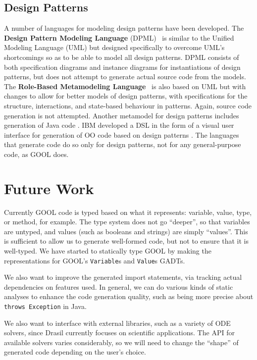\documentclass[sigplan,screen,10pt]{acmart}
\begin{document}
\subsection{Design Patterns}

A number of languages for modeling design patterns have been developed. The
\textbf{Design Pattern Modeling Language} (DPML)~\cite{mapelsden2002design} is similar
to the Unified Modeling Language (UML) but designed specifically to overcome
UML's shortcomings so as to be able to model all design patterns. DPML consists of
both specification diagrams and instance diagrams for instantiations of design
patterns, but does not attempt to generate actual source code from the models.
The \textbf{Role-Based Metamodeling Language}~\cite{kim2003uml} is also based on UML but
with changes to allow for better models of design patterns, with specifications
for the structure, interactions, and state-based behaviour in patterns. Again,
source code generation is not attempted. Another metamodel for design patterns
includes generation of Java code \cite{albin2001meta}. IBM developed a DSL in 
the form of a visual user interface for generation of OO code based on design 
patterns \cite{budinsky1996automatic}. The languages that
generate code do so only for design patterns, not for any general-purpose code,
as GOOL does.

\section{Future Work} \label{sec:future}

Currently GOOL code is typed based on what it represents:
variable, value, type, or method, for example. The type system does not
go ``deeper'', so that variables are untyped, and values (such as booleans
and strings) are simply ``values''.  This is sufficient to allow us to
generate well-formed code, but not to ensure that it is well-typed.
We have started to statically type GOOL by making the
representations for GOOL's \verb|Variable|s and \verb|Value|s GADTs. 

We also want to improve the generated import statements, via tracking
actual dependencies on features used.  In general, we can do various 
kinds of static analyses to enhance the code generation quality,
such as being more precise about \verb|throws Exception| in Java.

We also want to interface with external libraries, such as a variety of ODE
solvers, since Drasil currently focuses on scientific applications. The API for
available solvers varies considerably, so we will need to change the ``shape''
of generated code depending on the user's choice.
\end{document}
